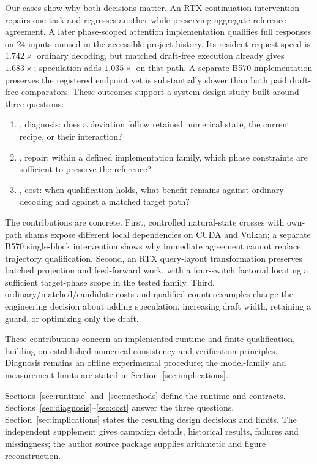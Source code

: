 Our cases show why both decisions matter. An RTX continuation intervention repairs one task and regresses another while preserving aggregate reference agreement. A later phase-scoped attention implementation qualifies full responses on 24 inputs unused in the accessible project history. Its resident-request speed is $1.742\times$ ordinary decoding, but matched draft-free execution already gives $1.683\times$; speculation adds $1.035\times$ on that path. A separate B570 implementation preserves the registered endpoint yet is substantially slower than both paid draft-free comparators. These outcomes support a system design study built around three questions:
\begin{enumerate}
\item {}, diagnosis: does a deviation follow retained numerical state, the current recipe, or their interaction?
\item {}, repair: within a defined implementation family, which phase constraints are sufficient to preserve the reference?
\item {}, cost: when qualification holds, what benefit remains against ordinary decoding and against a matched target path?
\end{enumerate}

The contributions are concrete. First, controlled natural-state crosses with own-path shams expose different local dependencies on CUDA and Vulkan; a separate B570 single-block intervention shows why immediate agreement cannot replace trajectory qualification. Second, an RTX query-layout transformation preserves batched projection and feed-forward work, with a four-switch factorial locating a sufficient target-phase scope in the tested family. Third, ordinary/matched/candidate costs and qualified counterexamples change the engineering decision about adding speculation, increasing draft width, retaining a guard, or optimizing only the draft.

These contributions concern an implemented runtime and finite qualification, building on established numerical-consistency and verification principles. Diagnosis remains an offline experimental procedure; the model-family and measurement limits are stated in Section~\ref{sec:implications}.

Sections~\ref{sec:runtime} and~\ref{sec:methods} define the runtime and contracts. Sections~\ref{sec:diagnosis}--\ref{sec:cost} answer the three questions. Section~\ref{sec:implications} states the resulting design decisions and limits. The independent supplement gives campaign details, historical results, failures and missingness; the author source package supplies arithmetic and figure reconstruction.

